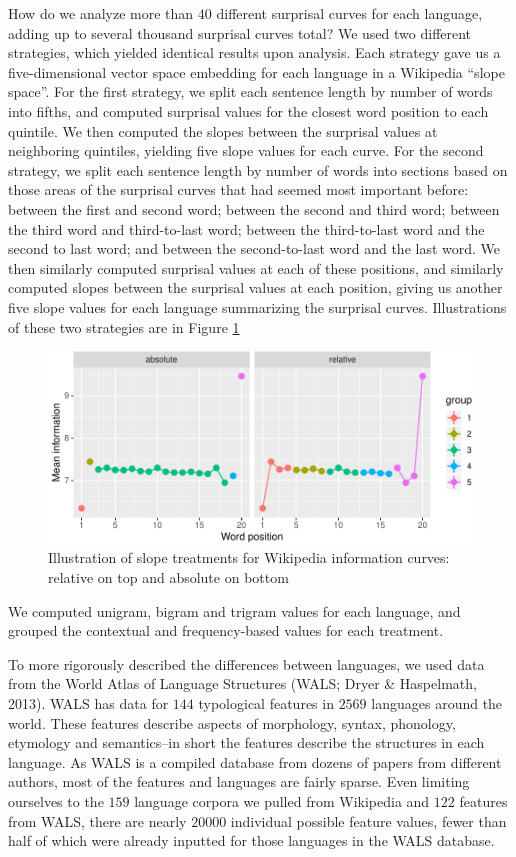 \documentclass[11pt,]{article}
\begin{document}
How do we analyze more than \(40\) different surprisal curves for each language, adding up to several thousand surprisal curves total? We used two different strategies, which yielded identical results upon analysis. Each strategy gave us a five-dimensional vector space embedding for each language in a Wikipedia ``slope space''. For the first strategy, we split each sentence length by number of words into fifths, and computed surprisal values for the closest word position to each quintile. We then computed the slopes between the surprisal values at neighboring quintiles, yielding five slope values for each curve. For the second strategy, we split each sentence length by number of words into sections based on those areas of the surprisal curves that had seemed most important before: between the first and second word; between the second and third word; between the third word and third-to-last word; between the third-to-last word and the second to last word; and between the second-to-last word and the last word. We then similarly computed surprisal values at each of these positions, and similarly computed slopes between the surprisal values at each position, giving us another five slope values for each language summarizing the surprisal curves. Illustrations of these two strategies are in Figure \ref{fig:treatments}

\begin{figure}
\centering
\includegraphics{paper_files/figure-latex/treatments-1.pdf}
\caption{\label{fig:treatments}Illustration of slope treatments for Wikipedia information curves: relative on top and absolute on bottom}
\end{figure}

We computed unigram, bigram and trigram values for each language, and grouped the contextual and frequency-based values for each treatment.

To more rigorously described the differences between languages, we used data from the World Atlas of Language Structures (WALS; Dryer \& Haspelmath, 2013). WALS has data for \(144\) typological features in \(2569\) languages around the world. These features describe aspects of morphology, syntax, phonology, etymology and semantics--in short the features describe the structures in each language. As WALS is a compiled database from dozens of papers from different authors, most of the features and languages are fairly sparse. Even limiting ourselves to the \(159\) language corpora we pulled from Wikipedia and \(122\) features from WALS, there are nearly \(20000\) individual possible feature values, fewer than half of which were already inputted for those languages in the WALS database.
\end{document}
